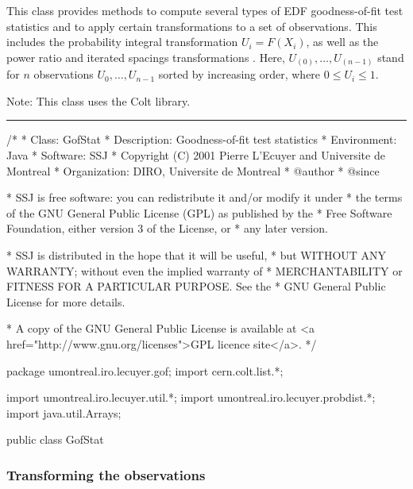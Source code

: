 
This class provides methods to compute several types of EDF goodness-of-fit
test statistics and to apply certain transformations to a set of
observations.  This includes the probability integral transformation
$U_i = F(X_i)$, as well as the power ratio and iterated spacings
transformations \cite{tSTE86a}. Here, $U_{(0)}, \dots, U_{(n-1)}$ stand
for $n$ observations $U_0,\dots,U_{n-1}$ sorted by increasing order, where
$0\le U_i\le 1$.

Note: This class uses the Colt library.

\bigskip\hrule

\begin{code}
\begin{hide}
/*
 * Class:        GofStat
 * Description:  Goodness-of-fit test statistics
 * Environment:  Java
 * Software:     SSJ
 * Copyright (C) 2001  Pierre L'Ecuyer and Universite de Montreal
 * Organization: DIRO, Universite de Montreal
 * @author
 * @since

 * SSJ is free software: you can redistribute it and/or modify it under
 * the terms of the GNU General Public License (GPL) as published by the
 * Free Software Foundation, either version 3 of the License, or
 * any later version.

 * SSJ is distributed in the hope that it will be useful,
 * but WITHOUT ANY WARRANTY; without even the implied warranty of
 * MERCHANTABILITY or FITNESS FOR A PARTICULAR PURPOSE.  See the
 * GNU General Public License for more details.

 * A copy of the GNU General Public License is available at
   <a href="http://www.gnu.org/licenses">GPL licence site</a>.
 */
\end{hide}
package umontreal.iro.lecuyer.gof;
   import cern.colt.list.*;
\begin{hide}
import umontreal.iro.lecuyer.util.*;
import umontreal.iro.lecuyer.probdist.*;
import java.util.Arrays;\end{hide}

public class GofStat\begin{hide} {
   private GofStat() {}
\end{hide}
\end{code}

\subsubsection*{Transforming the observations}

